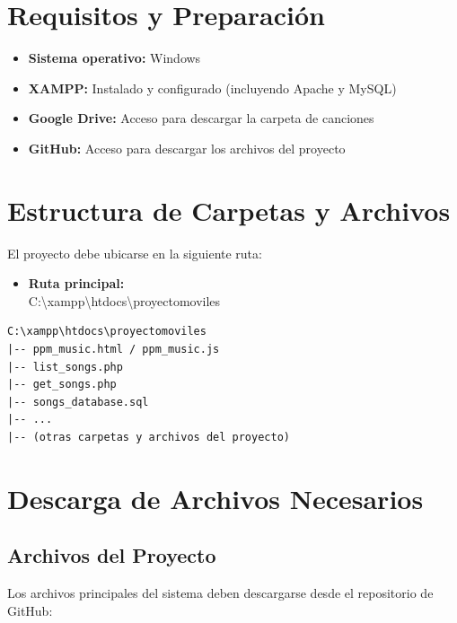 \documentclass[a4paper,12pt]{article}
\begin{document}
\section{Requisitos y Preparación}\label{sec:requisitos}
\begin{itemize}
    \item \textbf{Sistema operativo:} Windows
    \item \textbf{XAMPP:} Instalado y configurado (incluyendo Apache y MySQL)
    \item \textbf{Google Drive:} Acceso para descargar la carpeta de canciones
    \item \textbf{GitHub:} Acceso para descargar los archivos del proyecto
\end{itemize}

\section{Estructura de Carpetas y Archivos}\label{sec:estructura}
El proyecto debe ubicarse en la siguiente ruta:

\begin{itemize}
    \item \textbf{Ruta principal:} \\C:\textbackslash xampp\textbackslash htdocs\textbackslash proyectomoviles
\end{itemize}

\begin{verbatim}
C:\xampp\htdocs\proyectomoviles
|-- ppm_music.html / ppm_music.js
|-- list_songs.php
|-- get_songs.php
|-- songs_database.sql
|-- ...
|-- (otras carpetas y archivos del proyecto)
\end{verbatim}

\section{Descarga de Archivos Necesarios}\label{sec:descarga}
\subsection{Archivos del Proyecto}\label{subsec:archivos}
Los archivos principales del sistema deben descargarse desde el repositorio de GitHub:
\end{document}
